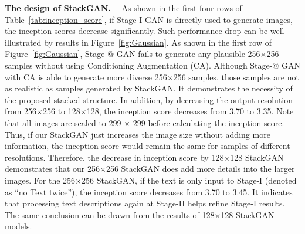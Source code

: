 \documentclass[10pt,twocolumn,letterpaper]{article}
\makeatletter
\newcommand{\Rmnum}[1]{\expandafter\@slowromancap\romannumeral #1@}
\makeatother
\begin{document}
\textbf{The design of StackGAN.}　
As shown in the first four rows of Table~\ref{tab:inception_score}, if Stage-I GAN is directly used to generate images, the inception scores decrease significantly. Such performance drop can be well illustrated by results in Figure~\ref{fig:Gaussian}. As shown in the first row of Figure~\ref{fig:Gaussian}, Stage-\Rmnum{1} GAN fails to generate any plausible 256$\times$256 samples without using Conditioning Augmentation (CA). Although Stage-\Rmnum{1} GAN with CA is able to generate more diverse 256$\times$256 samples, those samples are not as realistic as samples generated by StackGAN. It demonstrates the necessity of the proposed stacked structure. In addition, by decreasing the output resolution from 256$\times$256 to 128$\times$128, the inception score decreases from 3.70 to 3.35. 
Note that all images are scaled to 299 $\times$ 299 before calculating the inception score. Thus, if our StackGAN just increases the image size without adding more information, the inception score would remain the same for samples of different resolutions. Therefore, the decrease in inception score by 128$\times$128 StackGAN demonstrates that our 256$\times$256 StackGAN does add more details into the larger images. For the 256$\times$256 StackGAN, if the text is only input to Stage-I (denoted as ``no Text twice''), the inception score decreases from 3.70 to 3.45. It indicates that processing text descriptions again at Stage-II helps refine Stage-I results. The same conclusion can be drawn from the results of 128$\times$128 StackGAN models. 
\end{document}

